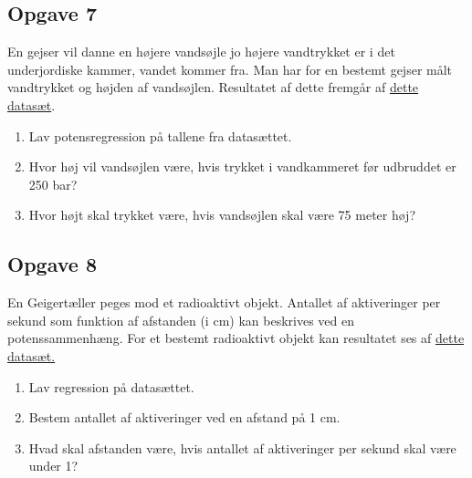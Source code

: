 \subsection*{Opgave 7}

En gejser vil danne en højere vandsøjle jo højere vandtrykket er i det underjordiske kammer, vandet kommer fra. Man har for en bestemt gejser målt vandtrykket og højden af vandsøjlen. Resultatet af dette fremgår af \href{https://github.com/ChristianJLex/TeachingNotes/raw/master/2023-2024/Data og lign/Gejser.xlsx}{\color{blue!60} dette datasæt}.

\begin{enumerate}[label=\roman*)]
	\item Lav potensregression på tallene fra datasættet.
	\item Hvor høj vil vandsøjlen være, hvis trykket i vandkammeret før udbruddet er 250 bar?
	\item Hvor højt skal trykket være, hvis vandsøjlen skal være 75 meter høj?
\end{enumerate}

\subsection*{Opgave 8}

En Geigertæller peges mod et radioaktivt objekt. Antallet af aktiveringer per sekund som funktion af afstanden (i cm) kan beskrives ved en potenssammenhæng. For et bestemt radioaktivt objekt kan resultatet ses af \href{https://github.com/ChristianJLex/TeachingNotes/raw/master/2023-2024/Data%20og%20lign/Geiger.xlsx}{\color{blue!60} dette datasæt.}

\begin{enumerate}[label=\roman*)]
	\item Lav regression på datasættet.
	\item Bestem antallet af aktiveringer ved en afstand på 1 cm. 
	\item Hvad skal afstanden være, hvis antallet af aktiveringer per sekund skal være under 1?
\end{enumerate}